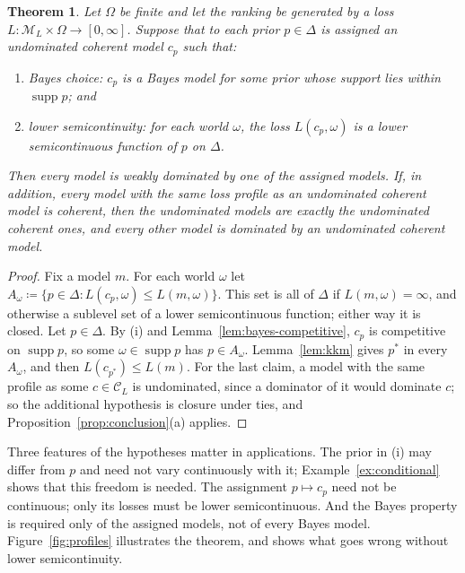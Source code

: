 \documentclass[11pt]{article}
\newtheorem{theorem}{Theorem}[section]
\theoremstyle{definition}
\theoremstyle{remark}
\newcommand{\M}{\mathcal M}
\newcommand{\C}{\mathcal C}
\newcommand{\supp}{\operatorname{supp}}
\begin{document}
\begin{theorem}\label{thm:bayes-finite}
Let $\Omega$ be finite and let the ranking be generated by a loss $L:\M_L\times\Omega\to[0,\infty]$. Suppose that to each prior $p\in\Delta$ is assigned an undominated coherent model $c_p$ such that:
\begin{enumerate}[label=(\roman*)]
\item \emph{Bayes choice}: $c_p$ is a Bayes model for some prior whose support lies within $\supp p$; and
\item \emph{lower semicontinuity}: for each world $\omega$, the loss $L(c_p,\omega)$ is a lower semicontinuous function of $p$ on $\Delta$.
\end{enumerate}
Then every model is weakly dominated by one of the assigned models. If, in addition, every model with the same loss profile as an undominated coherent model is coherent, then the undominated models are exactly the undominated coherent ones, and every other model is dominated by an undominated coherent model.
\end{theorem}
\begin{proof}
Fix a model $m$. For each world $\omega$ let $A_\omega\coloneqq\{p\in\Delta:L(c_p,\omega)\le L(m,\omega)\}$. This set is all of $\Delta$ if $L(m,\omega)=\infty$, and otherwise a sublevel set of a lower semicontinuous function; either way it is closed. Let $p\in\Delta$. By (i) and Lemma~\ref{lem:bayes-competitive}, $c_p$ is competitive on $\supp p$, so some $\omega\in\supp p$ has $p\in A_\omega$. Lemma~\ref{lem:kkm} gives $p^*$ in every $A_\omega$, and then $L(c_{p^*})\le L(m)$. For the last claim, a model with the same profile as some $c\in\C_L$ is undominated, since a dominator of it would dominate $c$; so the additional hypothesis is closure under ties, and Proposition~\ref{prop:conclusion}(a) applies.
\end{proof}

Three features of the hypotheses matter in applications. The prior in (i) may differ from $p$ and need not vary continuously with it; Example~\ref{ex:conditional} shows that this freedom is needed. The assignment $p\mapsto c_p$ need not be continuous; only its losses must be lower semicontinuous. And the Bayes property is required only of the assigned models, not of every Bayes model. Figure~\ref{fig:profiles} illustrates the theorem, and shows what goes wrong without lower semicontinuity.
\end{document}
